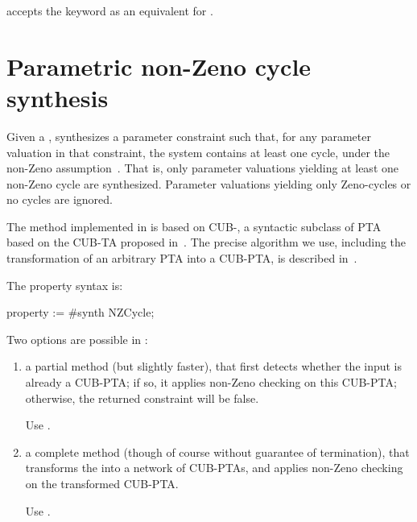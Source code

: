 \begin{syntaxalias}
	\imitator{} accepts the  keyword as an equivalent for .
\end{syntaxalias}



\section{Parametric non-Zeno cycle synthesis}\label{ss:mode:Zeno}

Given a \NIPTA{}, \imitator{} synthesizes a parameter constraint such that, for any parameter valuation in that constraint, the system contains at least one cycle, under the non-Zeno assumption~\cite{ANPS17}.
That is, only parameter valuations yielding at least one non-Zeno cycle are synthesized.
Parameter valuations yielding only Zeno-cycles or no cycles are ignored.

The method implemented in \imitator{} is based on CUB-\IPTA{}, a syntactic subclass of PTA based on the CUB-TA proposed in~\cite{WSWLSDYL15}.
The precise algorithm we use, including the transformation of an arbitrary PTA into a CUB-PTA, is described in~\cite{ANPS17}.

The property syntax is:

\begin{IMITATORproperty}
property := #synth NZCycle;
\end{IMITATORproperty}

Two options are possible in \imitator{}:
\begin{enumerate}
	\item a partial method (but slightly faster), that first detects whether the input \NIPTA{} is already a CUB-PTA; if so, it applies non-Zeno checking on this CUB-PTA; otherwise, the returned constraint will be false.

	      Use .

	\item a complete method (though of course without guarantee of termination), that transforms the \NIPTA{} into a network of CUB-PTAs, and applies non-Zeno checking on the transformed CUB-PTA.

	      Use .

\end{enumerate}

